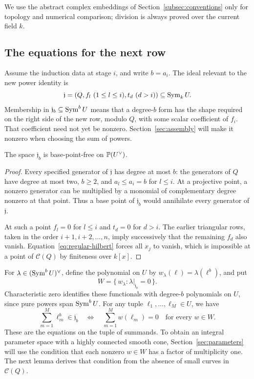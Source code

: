 We use the abstract complex embeddings of Section~\ref{subsec:conventions}
only for topology and numerical comparison; division is always proved
over the current field \(k\).

\subsection{The equations for the next row}

Assume the induction data at stage \(i\), and write \(b=a_i\).
The ideal relevant to the new power identity is
\begin{equation}\label{eq:stage-ideal}
 \mathfrak j=(Q,f_l\ (1\le l\le i),t_d\ (d>i))
       \subseteq\operatorname{Sym}_k U.
\end{equation}
Membership in \(\mathfrak j_b\subseteq\operatorname{Sym}^b U\) means that a
degree-\(b\) form has the shape required on the right side of the new
row, modulo \(Q\), with some scalar coefficient of \(f_i\).
That coefficient need not yet be nonzero. Section~\ref{sec:assembly}
will make it nonzero when choosing the sum of powers.

\begin{lemma}\label{lem:stage-basepoint}
The space \(\mathfrak j_b\) is base-point-free on \(\mathbb P(U^\vee)\).
\end{lemma}

\begin{proof}
Every specified generator of \(\mathfrak j\) has degree at most
\(b\): the generators of \(Q\) have degree at most two,
\(b\ge2\), and \(a_l\le a_i=b\) for \(l\le i\).
At a projective point, a nonzero generator can be multiplied by a
monomial of complementary degree nonzero at that point.
Thus a base point of \(\mathfrak j_b\) would annihilate every
generator of \(\mathfrak j\).

At such a point \(f_l=0\) for \(l\le i\) and \(t_d=0\) for \(d>i\).
The earlier triangular rows, taken in the order
\(i+1,i+2,\ldots,n\), imply successively that the remaining \(f_d\)
also vanish. Equation~\eqref{eq:regular-hilbert} forces all \(x_j\)
to vanish, which is impossible at a point of \(\mathcal C(Q)\)
by finiteness over \(k[x]\).
\end{proof}

For \(\lambda\in(\operatorname{Sym}^b U)^\vee\), define the polynomial on \(U\)
by \(w_\lambda(\ell)=\lambda(\ell^b)\), and put
\begin{equation}\label{eq:stage-annihilator}
 W=\{\,w_\lambda:\lambda|_{\mathfrak j_b}=0\,\}.
\end{equation}
Characteristic zero identifies these functionals with degree-\(b\)
polynomials on \(U\), since pure powers span \(\operatorname{Sym}^b U\).
For any tuple \(\ell_1,\ldots,\ell_M\in U\), we have
\[
 \sum_{m=1}^M\ell_m^b\in\mathfrak j_b
 \quad\Longleftrightarrow\quad
 \sum_{m=1}^M w(\ell_m)=0
 \quad\text{for every }w\in W.
\]
These are the equations on the tuple of summands. To obtain an integral
parameter space with a highly connected smooth cone, Section~\ref{sec:parameters}
will use the condition that each nonzero \(w\in W\) has a factor of
multiplicity one. The next lemma derives that condition from the
absence of small curves in \(\mathcal C(Q)\).

